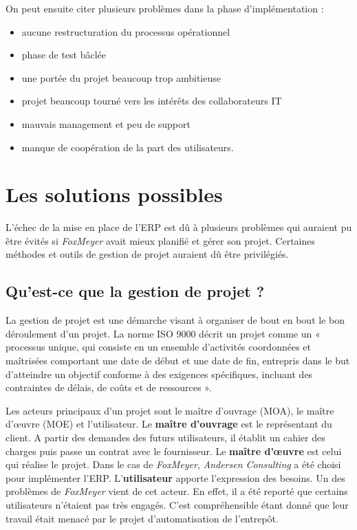 \documentclass[12pt]{report}
\begin{document}
On peut ensuite citer plusieurs problèmes dans la phase d’implémentation :
\begin{itemize}
\item aucune restructuration du processus opérationnel
\item phase de test bâclée
\item une portée du projet beaucoup trop ambitieuse
\item projet beaucoup tourné vers les intérêts des collaborateurs IT
\item mauvais management et peu de support
\item manque de coopération de la part des utilisateurs\cite{zimmerfoxmeyer}.
\end{itemize}

\section{Les solutions possibles}

L'échec de la mise en place de l'ERP est dû à plusieurs problèmes qui auraient pu être évités si \textit{FoxMeyer} avait mieux planifié et gérer son projet. Certaines méthodes et outils de gestion de projet auraient dû être privilégiés.

\subsection{Qu'est-ce que la gestion de projet ?}

La gestion de projet est une démarche visant à organiser de bout en bout le bon déroulement d'un projet.
La norme ISO 9000 décrit un projet comme un « processus unique, qui consiste en un ensemble d'activités coordonnées et maîtrisées comportant une date de début et une date de fin, entrepris dans le but d'atteindre un objectif conforme à des 
exigences spécifiques, incluant des contraintes de délais, de coûts et de ressources »\cite{wikigestion}.

Les acteurs principaux d'un projet sont le maître d'ouvrage (MOA), le maître d’œuvre (MOE) et l'utilisateur.
Le \textbf{maître d'ouvrage} est le représentant du client. A partir des demandes des futurs utilisateurs, il établit un cahier des charges puis passe un contrat avec le fournisseur.
Le \textbf{maître d’œuvre} est celui qui réalise le projet. Dans le cas de \textit{FoxMeyer}, \textit{Andersen Consulting} a été choisi pour implémenter l'ERP.
L'\textbf{utilisateur} apporte l'expression des besoins. Un des problèmes de \textit{FoxMeyer} vient de cet acteur. En effet, il a été reporté que certains utilisateurs n'étaient pas très engagés. C'est compréhensible étant donné que leur travail était menacé par le projet d'automatisation de l'entrepôt\cite{zimmerfoxmeyer}.
\end{document}
